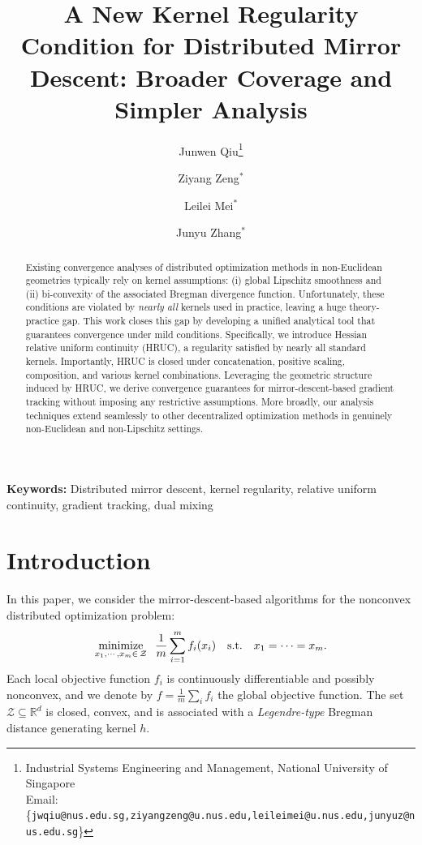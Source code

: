 \documentclass{article}
\title{A New Kernel Regularity Condition for Distributed Mirror Descent: Broader Coverage and Simpler Analysis}
\author{Junwen Qiu\thanks{Industrial Systems Engineering and Management, National University of Singapore
  \\ Email: \{\texttt{jwqiu@nus.edu.sg,ziyangzeng@u.nus.edu,leileimei@u.nus.edu,junyuz@nus.edu.sg}\}} \and 
        Ziyang Zeng${}^*$ \and Leilei Mei${}^*$ \and Junyu Zhang${}^*$ }
\theoremstyle{plain}
\theoremstyle{definition}
\theoremstyle{remark}
\newcommand{\cZ}{\mathcal{Z}}
\begin{document}
\maketitle
\begin{abstract}
Existing convergence analyses of distributed optimization methods in non-Euclidean geometries typically rely on kernel assumptions: (i) global Lipschitz smoothness and (ii)  bi-convexity of the associated Bregman divergence function. Unfortunately, these conditions are violated by \emph{nearly all} kernels used in practice, leaving a huge theory-practice gap. This work closes this gap by developing a unified analytical tool that guarantees convergence under mild conditions. Specifically, we introduce Hessian relative uniform continuity (HRUC), a regularity satisfied by nearly all standard kernels. Importantly, HRUC is closed under concatenation, positive scaling, composition, and various kernel combinations. Leveraging the geometric structure induced by HRUC, we derive convergence guarantees for mirror-descent-based gradient tracking without imposing any restrictive assumptions. More broadly, our analysis techniques extend seamlessly to other decentralized optimization methods in genuinely non-Euclidean and non-Lipschitz settings.
\end{abstract}

\textbf{Keywords:} Distributed mirror descent, kernel regularity, relative uniform continuity, gradient tracking, dual mixing

\section{Introduction}
\label{sec:intro}
In this paper, we consider the mirror-descent-based algorithms for the nonconvex distributed optimization problem:
\begin{equation}\label{eq:problem}
    \mathop{\rm minimize}_{x_1,\cdots,x_m\in\,\cZ}\;\; \frac1m\sum_{i=1}^m f_i(x_i)\quad \mbox{s.t.}\quad x_1 = \cdots = x_m.
\end{equation}
Each local objective function $f_i$ is continuously differentiable and possibly nonconvex, and we denote by $f = \frac{1}{m}\sum_i f_i$ the global objective function.
The set $\cZ\subseteq\mathbb{R}
^d$ is closed, convex, and is associated with a \emph{Legendre-type} Bregman distance generating kernel $h$.   
 
\end{document}
